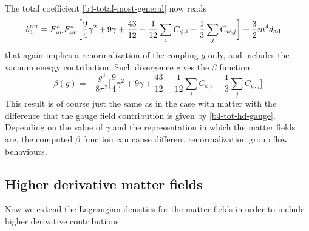 The total coefficient \eqref{b4-total-most-general} now reads
\begin{equation}
\begin{split}
b_4^{ \text{tot} }
	& =
F_{\mu\nu}^a F_{\mu\nu}^a
\bigg[
\frac{9}{4} \gamma^2 + 9 \gamma + \frac{43}{12}  
- \frac{1}{12} \sum_i C_{\phi,i}
- \frac{1}{3}  \sum_j C_{\psi,j}
\bigg]
+ \frac{3}{2} m^4 d_{ \text{ad} }
\end{split}
\end{equation}
that again implies a renormalization of the \ym{} coupling $g$ only, and includes the vacuum energy contribution. Such divergence gives the $\beta$ function
\begin{equation}
\beta(g)
	=
- \frac{g^3}{8 \pi^2}
\bigg[
\frac{9}{4} \gamma^2 + 9 \gamma + \frac{43}{12}  
- \frac{1}{12} \sum_i C_{\phi,i}
- \frac{1}{3}  \sum_j C_{\psi,j}
\bigg]
\end{equation}
This result is of course just the same as in the case \ym{} with matter with the difference that the gauge field contribution is given by \eqref{b4-tot-hd-gauge}.
Depending on the value of $\gamma$ and the representation in which the matter fields are, the computed $\beta$ function can cause different renormalization group flow behaviours.






\subsection{Higher derivative matter fields}


Now we extend the Lagrangian densities for the matter fields  in order to include higher derivative contributions.

